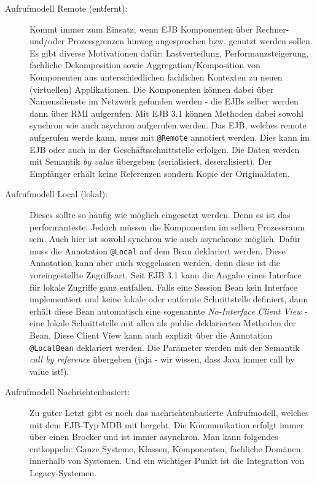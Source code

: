\begin{description}
	\item[Aufrufmodell Remote (entfernt):] Kommt immer zum Einsatz, wenn EJB Komponenten über Rechner- und/oder Prozessgrenzen hinweg angesprochen bzw. genutzt werden sollen. Es gibt diverse Motivationen dafür: Lastverteilung, Performanzsteigerung, fachliche Dekomposition sowie Aggregation/Komposition von Komponenten aus unterschiedlichen fachlichen Kontexten zu neuen (virtuellen) Applikationen. Die Komponenten können dabei über Namensdienste im Netzwerk gefunden werden - die EJBs selber werden dann über RMI aufgerufen. Mit EJB 3.1 können Methoden dabei sowohl synchron wie auch asychron aufgerufen werden. Das EJB, welches remote aufgerufen werde kann, muss mit \verb|@Remote| annotiert werden. Dies kann im EJB oder auch in der Geschäftsschnittstelle erfolgen. Die Daten werden mit Semantik \emph{by value} übergeben (serialisiert, deseralisiert). Der Empfänger erhält keine Referenzen sondern Kopie der Originaldaten.
	
	\item[Aufrufmodell Local (lokal):] Dieses sollte so häufig wie möglich eingesetzt werden. Denn es ist das performanteste. Jedoch müssen die Komponenten im selben Prozessraum sein. Auch hier ist sowohl synchron wie auch asynchrone möglich. Dafür muss die Annotation \verb|@Local| auf dem Bean deklariert werden. Diese Annotation kann aber auch weggelassen werden, denn diese ist die voreingestellte Zugriffsart.
	Seit EJB 3.1 kann die Angabe eines Interface für lokale Zugriffe ganz entfallen. Falls eine Session Bean kein Interface implementiert und keine lokale oder entfernte Schnittstelle definiert, dann erhält diese Bean automatisch eine sogenannte \emph{No-Interface Client View} - eine lokale Schnittstelle mit allen als public deklarierten Methoden der Bean. Diese Client View kann auch explizit über die Annotation \verb|@LocalBean| deklariert werden. Die Parameter werden mit der Semantik \emph{call by reference} übergeben (jaja - wir wissen, dass Java immer call by value ist!). 
	
	\item[Aufrufmodell Nachrichtenbasiert:] Zu guter Letzt gibt es noch das nachrichtenbasierte Aufrufmodell, welches mit dem EJB-Typ MDB mit hergeht. Die Kommunikation erfolgt immer über einen Brocker und ist immer asynchron. Man kann folgendes entkoppeln: Ganze Systeme, Klassen, Komponenten, fachliche Domänen innerhalb von Systemen. Und ein wichtiger Punkt ist die Integration von Legacy-Systemen.
\end{description}

